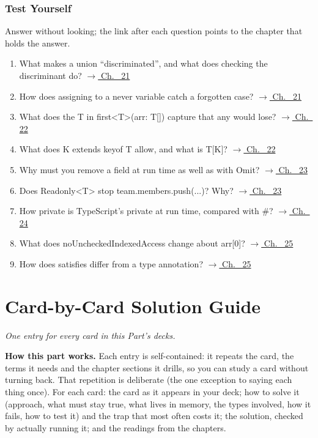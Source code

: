 \documentclass[10pt]{article}
\newcommand{\code}[1]{{\ttfamily\small #1}}
\newcommand{\partq}[2]{\part*{#1}{\small\itshape #2}}
\newcommand{\partline}[2]{\phantomsection\partq{#1}{#2}}  %
\begin{document}
\section*{Test Yourself}
Answer without looking; the link after each question points to the chapter that holds the answer.
\begin{enumerate}[leftmargin=1.6em,itemsep=3pt]
\item What makes a union ``discriminated'', and what does checking the discriminant do? \hfill{\small\hyperref[ch:c21]{$\rightarrow$ Ch.~ 21}}
\item How does assigning to a \code{never} variable catch a forgotten case? \hfill{\small\hyperref[ch:c21]{$\rightarrow$ Ch.~ 21}}
\item What does the \code{T} in \code{first\textless{}T\textgreater{}(arr: T[])} capture that \code{any} would lose? \hfill{\small\hyperref[ch:c22]{$\rightarrow$ Ch.~ 22}}
\item What does \code{K extends keyof T} allow, and what is \code{T[K]}? \hfill{\small\hyperref[ch:c22]{$\rightarrow$ Ch.~ 22}}
\item Why must you remove a field at run time as well as with \code{Omit}? \hfill{\small\hyperref[ch:c23]{$\rightarrow$ Ch.~ 23}}
\item Does \code{Readonly\textless{}T\textgreater{}} stop \code{team.members.push(...)}? Why? \hfill{\small\hyperref[ch:c23]{$\rightarrow$ Ch.~ 23}}
\item How private is TypeScript's \code{private} at run time, compared with \code{\#}? \hfill{\small\hyperref[ch:c24]{$\rightarrow$ Ch.~ 24}}
\item What does \code{noUncheckedIndexedAccess} change about \code{arr[0]}? \hfill{\small\hyperref[ch:c25]{$\rightarrow$ Ch.~ 25}}
\item How does \code{satisfies} differ from a type annotation? \hfill{\small\hyperref[ch:c25]{$\rightarrow$ Ch.~ 25}}
\end{enumerate}
\newpage{}\partline{Card-by-Card Solution Guide}{One entry for every card in this Part's decks.}
\begin{corebox}\textbf{How this part works.} Each entry is self-contained: it repeats the card, the terms it needs and the chapter sections it drills, so you can study a card without turning back. That repetition is deliberate (the one exception to saying each thing once). For each card: the card as it appears in your deck; how to solve it (approach, what must stay true, what lives in memory, the types involved, how it fails, how to test it) and the trap that most often costs it; the solution, checked by actually running it; and the readings from the chapters.\end{corebox}
\end{document}
